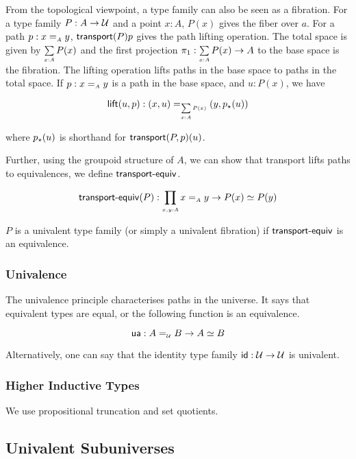 From the topological viewpoint, a type family can also be seen as a fibration. For a type family $P : A \to \mathcal{U}$ and a
point $x : A$, $P(x)$ gives the fiber over $a$. For a path $p : x \id_{A} y$, $\operatorname{\mathsf{transport}}({P}){p}$ gives the path lifting
operation. The total space is given by $\dsum{x:A}{P(x)}$ and the first projection $\pi_1 : \dsum{x:A}{P(x)} \to A$ to
the base space is the fibration. The lifting operation lifts paths in the base space to paths in the total space. If
$p : x \id_{A} y$ is a path in the base space, and $u : P(x)$, we have

\[
  \term{lift}(u,p) : (x , u) \id_{\dsum{x:A}{P(x)}} (y , \tr{p}{u})
\]

where ${p}_{\star}({u})$ is shorthand for $\operatorname{\mathsf{transport}}({P,p})(u)$.

Further, using the groupoid structure of $A$, we can show that transport lifts paths to equivalences, we define
$\operatorname{\mathsf{transport-equiv}}$.

\[
  \term{transport-equiv}(P) : \dfun{x,y:A}{x \id_{A} y \to P(x) \eqv P(y)}
\]

\begin{definition}
  $P$ is a univalent type family (or simply a univalent fibration) if
  $\operatorname{\mathsf{transport-equiv}}$ is an equivalence.
\end{definition}

\subsubsection{Univalence}

The univalence principle characterises paths in the universe. It says that equivalent types are equal, or the following
function is an equivalence.

\[
  \ua : A \id_{\UU} B \to A \eqv B
\]

Alternatively, one can say that the identity type family $\operatorname{\mathsf{id}} : \mathcal{U} \to \mathcal{U}$ is univalent.

\subsubsection{Higher Inductive Types}

We use propositional truncation and set quotients.

\subsection{Univalent Subuniverses}

